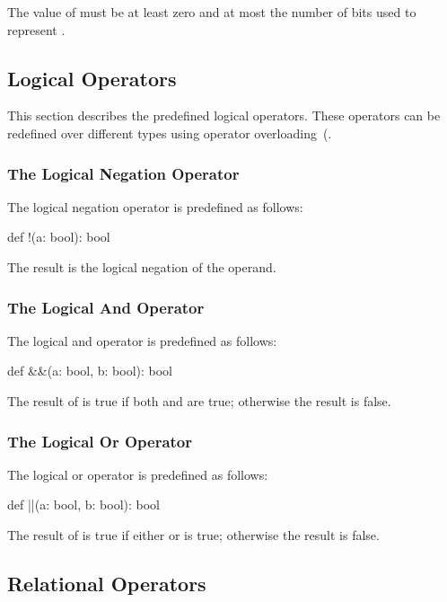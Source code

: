 The value of  must be at least zero and at most the number of
bits used to represent .

\subsection{Logical Operators}
\label{Logical_Operators}

This section describes the predefined logical operators.  These
operators can be redefined over different types using operator
overloading~(.

\subsubsection{The Logical Negation Operator}
\label{Logical_Negation_Operators}

The logical negation operator is predefined as follows:
\begin{chapel}
def !(a: bool): bool
\end{chapel}
The result is the logical negation of the operand.

\subsubsection{The Logical And Operator}
\label{Logical_And_Operators}

The logical and operator is predefined as follows:
\begin{chapel}
def &&(a: bool, b: bool): bool
\end{chapel}
The result of  is true if both  and  are
true; otherwise the result is false.

\subsubsection{The Logical Or Operator}
\label{Logical_Or_Operators}

The logical or operator is predefined as follows:
\begin{chapel}
def ||(a: bool, b: bool): bool
\end{chapel}
The result of  is true if either  or  is
true; otherwise the result is false.

\subsection{Relational Operators}
\label{Relational_Operators}

